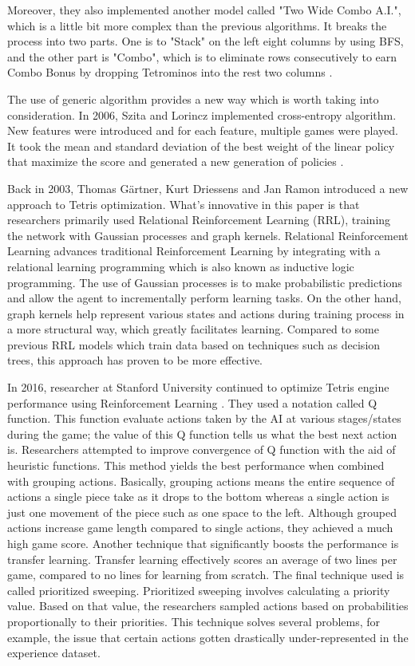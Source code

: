\documentclass[letterpaper]{article} %
\begin{document}
Moreover, they also implemented another model called "Two Wide Combo A.I.", which is a little bit more complex than the previous algorithms. It breaks the process into two parts. One is to "Stack" on the left eight columns by using BFS, and the other part is "Combo", which is to eliminate rows consecutively to earn Combo Bonus by dropping Tetrominos into the rest two columns \cite{WCWT}.

The use of generic algorithm provides a new way which is worth taking into consideration. In 2006, Szita and Lorincz implemented cross-entropy algorithm. New features were introduced and for each feature, multiple games were played. It took the mean and standard deviation of the best weight of the linear policy that maximize the score and generated a new generation of policies \cite{SO19}.

Back in 2003, Thomas Gärtner, Kurt Driessens and Jan Ramon introduced a new approach to Tetris optimization\cite{s017}. What's innovative in this paper is that researchers primarily used Relational Reinforcement Learning (RRL), training the network with Gaussian processes and graph kernels. Relational Reinforcement Learning advances traditional Reinforcement Learning by integrating with a relational learning programming which is also known as inductive logic programming. The use of Gaussian processes is to make probabilistic predictions and allow the agent to incrementally perform learning tasks. On the other hand, graph kernels help represent various states and actions during training process in a more structural way, which greatly facilitates learning. Compared to some previous RRL models which train data based on techniques such as decision trees, this approach has proven to be more effective.

In 2016, researcher at Stanford University continued to optimize Tetris engine performance using Reinforcement Learning \cite{s016}. They used a notation called Q function. This function evaluate actions taken by the AI at various stages/states during the game; the value of this Q function tells us what the best next action is. Researchers attempted to improve convergence of Q function with the aid of heuristic functions. This method yields the best performance when combined with grouping actions. Basically, grouping actions means the entire sequence of actions a single piece take as it drops to the bottom whereas a single action is just one movement of the piece such as one space to the left. Although grouped actions increase game length compared to single actions, they achieved a much high game score. Another technique that significantly boosts the performance is transfer learning. Transfer learning effectively scores an average of two lines per game, compared to no lines for learning from scratch. The final technique used is called prioritized sweeping. Prioritized sweeping involves calculating a priority value. Based on that value, the researchers sampled actions based on probabilities proportionally to their priorities. This technique solves several problems, for example, the issue that certain actions gotten drastically under-represented in the experience dataset.
\end{document}
